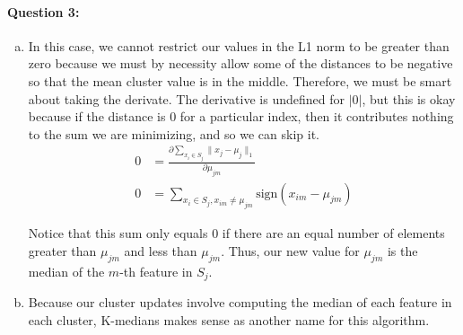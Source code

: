 \documentclass[letterpaper,11pt]{article}
\begin{document}
\paragraph{Question 3:}
\begin{enumerate}[(a)]
    \item
        In this case, we cannot restrict our values in the L1 norm to be greater
        than zero because we must by necessity allow some of the distances to be
        negative so that the mean cluster value is in the middle. Therefore, we must
        be smart about taking the derivate. The derivative is undefined for $|0|$, but this
        is okay because if the distance is $0$ for a particular index, then it contributes
        nothing to the sum we are minimizing, and so we can skip it.
        \begin{align}
            0 & = \frac{\partial \sum_{x_i\in S_j}\|x_j-\mu_j\|_1}{\partial \mu_{jm}}\\ 
            0 & = \sum_{x_i\in S_j, x_{im} \neq \mu_{jm}} \mathrm{sign}(x_{im} - \mu_{jm})
        \end{align}

        Notice that this sum only equals $0$ if there are an equal number of elements greater
        than $\mu_{jm}$ and less than $\mu_{jm}$. Thus, our new value for $\mu_{jm}$ is
        the median of the $m$-th feature in $S_j$.
    \item
        Because our cluster updates involve computing the median of each feature
        in each cluster, K-medians makes sense as another name for this algorithm.
\end{enumerate}
\end{document}

